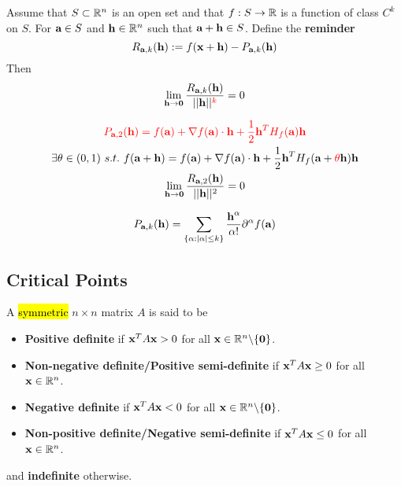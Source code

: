 \documentclass[11pt]{article}
\begin{document}
			\begin{theorem}
				Assume that $S \subset \mathbb{R}^n$ is an open set and that $f: S \to \mathbb{R}$ is a function of class $C^k$ on $S$. For $\textbf{a} \in S$ and $\textbf{h} \in \mathbb{R}^n$ such that $\textbf{a} + \textbf{h} \in S$. Define the \textbf{reminder}
				\begin{equation}
					R_{\textbf{a}, k}(\textbf{h}) := f(\textbf{x} + \textbf{h}) - P_{\textbf{a}, k}(\textbf{h})
				\end{equation}
				Then 
				\begin{equation}
					\lim_{\textbf{h} \to \textbf{0}} \frac{R_{\textbf{a}, k}(\textbf{h})}{\vert \vert {\textbf{h}} \vert \vert^{\textcolor{red}{k}}} = 0
				\end{equation}
			\end{theorem}
			
			\begin{theorem}
				\begin{gather}
					\textcolor{red}{P_{\textbf{a}, 2}(\textbf{h}) = f(\textbf{a}) + \nabla f(\textbf{a}) \cdot \textbf{h} + \frac{1}{2} \textbf{h}^T H_f(\textbf{a}) \textbf{h}} \\
					\exists \theta \in (0, 1)\ s.t.\ f(\textbf{a}+\textbf{h}) = f(\textbf{a}) + \nabla f(\textbf{a}) \cdot \textbf{h} + \frac{1}{2} \textbf{h}^T H_f(\textbf{a} + \textcolor{red}{\theta} \textbf{h}) \textbf{h} \\
					\lim_{\textbf{h} \to \textbf{0}} \frac{R_{\textbf{a}, 2}(\textbf{h})}{\vert \vert {\textbf{h}} \vert \vert^2} = 0
				\end{gather}
			\end{theorem}
			
			\begin{definition}
				\begin{equation}
					P_{\textbf{a}, k}(\textbf{h}) = \sum_{\{\alpha : |\alpha| \leq k\}}\frac {\textbf{h}^\alpha}{\alpha!}{\partial^\alpha f(\textbf{a})}
				\end{equation}
			\end{definition}
			
		\subsection{Critical Points}
			\begin{definition}
				A \hl{symmetric} $n \times n$ matrix $A$ is said to be
				\begin{itemize}
					\item \textbf{Positive definite} if $\textbf{x}^T A \textbf{x} > 0$ for all $\textbf{x} \in \mathbb{R}^n \backslash \{\textbf{0}\}$.
					\item \textbf{Non-negative definite/Positive semi-definite} if $\textbf{x}^T A \textbf{x} \geq 0$ for all $\textbf{x} \in \mathbb{R}^n$.
					\item \textbf{Negative definite} if $\textbf{x}^T A \textbf{x} < 0$ for all $\textbf{x} \in \mathbb{R}^n \backslash \{\textbf{0}\}$.
					\item \textbf{Non-positive definite/Negative semi-definite} if $\textbf{x}^T A \textbf{x} \leq 0$ for all $\textbf{x} \in \mathbb{R}^n$.
				\end{itemize}
				and \textbf{indefinite} otherwise.
			\end{definition}
			
\end{document}

